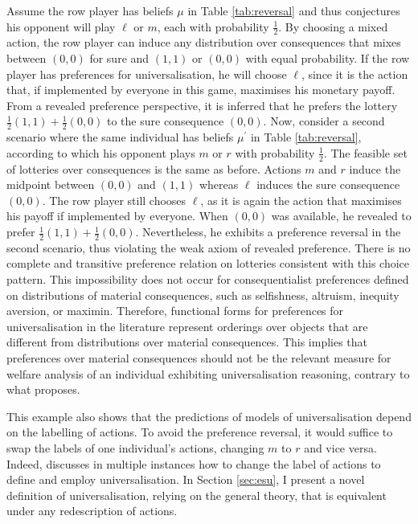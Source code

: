 Assume the row player has beliefs \(\mu\) in Table \ref{tab:reversal} and thus conjectures his opponent will play \(\ell\) or \(m\), each with probability \(\frac{1}{2}\). By choosing a mixed action, the row player can induce any distribution over consequences that mixes between \((0,0)\) for sure and \((1,1)\) or \((0,0)\) with equal probability. If the row player has preferences for universalisation, he will choose \(\ell\), since it is the action that, if implemented by everyone in this game, maximises his monetary payoff. From a revealed preference perspective, it is inferred that he prefers the lottery \(\frac{1}{2} (1,1 ) + \frac{1}{2} (0,0 )\) to the sure consequence \((0,0 )\). Now, consider a second scenario where the same individual has beliefs \(\mu^{\prime}\) in Table \ref{tab:reversal}, according to which his opponent plays \(m\) or \(r\) with probability \(\frac{1}{2}\). The feasible set of lotteries over consequences is the same as before. Actions \(m\) and \(r\) induce the midpoint between \((0,0 )\) and \((1,1 )\) whereas \(\ell\) induces the sure consequence \((0,0)\). The row player still chooses \(\ell\), as it is again the action that maximises his payoff if implemented by everyone. When \((0,0)\) was available, he revealed to prefer \(\frac{1}{2} (1,1 ) + \frac{1}{2} (0,0 )\). Nevertheless, he exhibits a preference reversal in the second scenario, thus violating the weak axiom of revealed preference. There is no complete and transitive preference relation on lotteries consistent with this choice pattern. This impossibility does not occur for consequentialist preferences defined on distributions of material consequences, such as selfishness, altruism, inequity aversion, or maximin. Therefore, functional forms for preferences for universalisation in the literature represent orderings over objects that are different from distributions over material consequences. This implies that preferences over material consequences should not be the relevant measure for welfare analysis of an individual exhibiting universalisation reasoning, contrary to what \cite{roemer2019cooperate} proposes.

This example also shows that the predictions of models of universalisation depend on the labelling of actions. To avoid the preference reversal, it would suffice to swap the labels of one individual's actions, changing \( m \) to \( r \) and vice versa. Indeed, \cite{roemer2019cooperate} discusses in multiple instances how to change the label of actions to define and employ universalisation. In Section \ref{sec:esu}, I present a novel definition of universalisation, relying on the general theory, that is equivalent under any redescription of actions.

